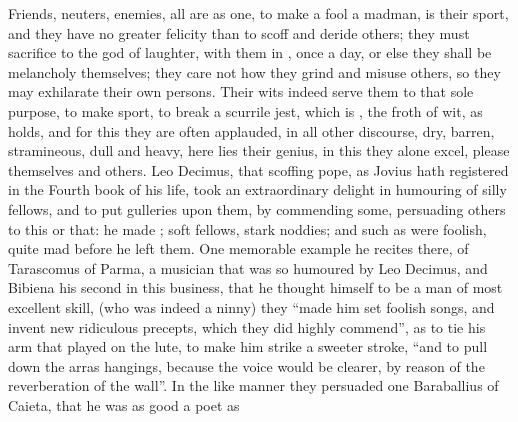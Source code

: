 
Friends, neuters, enemies, all are as one, to make a fool a madman, is their
sport, and they have no greater felicity than to scoff and deride others; they
must sacrifice to the god of laughter, with them in
\Apuleius, once a day, or else they shall be melancholy
themselves; they care not how they grind and misuse others, so they may
exhilarate their own persons. Their wits indeed serve them to that sole
purpose, to make sport, to break a scurrile jest, which is , the froth of wit, as \Tully{} holds, and
for this they are often applauded, in all other discourse, dry, barren,
stramineous, dull and heavy, here lies their genius, in this they alone excel,
please themselves and others. Leo Decimus, that scoffing pope, as Jovius hath
registered in the Fourth book of his life, took an extraordinary delight in
humouring of silly fellows, and to put gulleries upon them,
by commending some, persuading others to this or that: he
made ;
soft fellows, stark noddies; and such as were foolish, quite mad before he left
them. One memorable example he recites there, of Tarascomus of Parma, a
musician that was so humoured by Leo Decimus, and Bibiena his second in this
business, that he thought himself to be a man of most excellent skill, (who was
indeed a ninny) they \enquote{made him set foolish songs, and
invent new ridiculous precepts, which they did highly commend}, as to tie his
arm that played on the lute, to make him strike a sweeter stroke,
\enquote{and to pull down the arras hangings, because the voice
would be clearer, by reason of the reverberation of the wall}. In the like
manner they persuaded one Baraballius of Caieta, that he was as good a poet as
